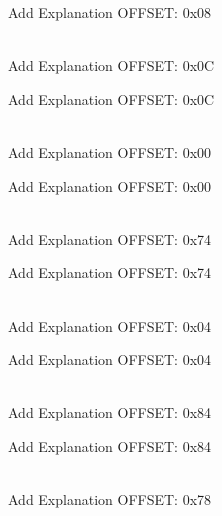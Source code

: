 \begin{DoxyRefList}
\label{todo__todo000093}%
%
Add Explanation OFFSET\+: 0x08  
\item[{\parbox[t]{\linewidth}{Member \doxylink{struct_r_c_c___reg_def__t_a6dd6326b8e6e3aaa6dd9e76745a4ca36}{RCC\+\_\+\+Reg\+Def\+\_\+t\+::CIR} }}]\hfill \\
\label{todo__todo000024}%
%
Add Explanation OFFSET\+: 0x0C 

\label{todo__todo000094}%
%
Add Explanation OFFSET\+: 0x0C  
\item[{\parbox[t]{\linewidth}{Member \doxylink{struct_r_c_c___reg_def__t_a42e75571aeb42e0c2796c460a06e2e2a}{RCC\+\_\+\+Reg\+Def\+\_\+t\+::CR} }}]\hfill \\
\label{todo__todo000021}%
%
Add Explanation OFFSET\+: 0x00 

\label{todo__todo000091}%
%
Add Explanation OFFSET\+: 0x00  
\item[{\parbox[t]{\linewidth}{Member \doxylink{struct_r_c_c___reg_def__t_ad5c31d6b10eeff0d74d1a4213327af09}{RCC\+\_\+\+Reg\+Def\+\_\+t\+::CSR} }}]\hfill \\
\label{todo__todo000050}%
%
Add Explanation OFFSET\+: 0x74 

\label{todo__todo000120}%
%
Add Explanation OFFSET\+: 0x74  
\item[{\parbox[t]{\linewidth}{Member \doxylink{struct_r_c_c___reg_def__t_a0ac141565a18dadd2c131adae95f4314}{RCC\+\_\+\+Reg\+Def\+\_\+t\+::PLLCFGR} }}]\hfill \\
\label{todo__todo000022}%
%
Add Explanation OFFSET\+: 0x04 

\label{todo__todo000092}%
%
Add Explanation OFFSET\+: 0x04  
\item[{\parbox[t]{\linewidth}{Member \doxylink{struct_r_c_c___reg_def__t_a8eec149ac5b3db9c512a93e44184804e}{RCC\+\_\+\+Reg\+Def\+\_\+t\+::PLLI2\+SCFGR} }}]\hfill \\
\label{todo__todo000054}%
%
Add Explanation OFFSET\+: 0x84 

\label{todo__todo000124}%
%
Add Explanation OFFSET\+: 0x84  
\item[{\parbox[t]{\linewidth}{Member \doxylink{struct_r_c_c___reg_def__t_af71b3d9fcdd56a037baddb4f5806f34b}{RCC\+\_\+\+Reg\+Def\+\_\+t\+::reserve10} }}]\hfill \\
\label{todo__todo000051}%
%
Add Explanation OFFSET\+: 0x78 


\end{DoxyRefList}
